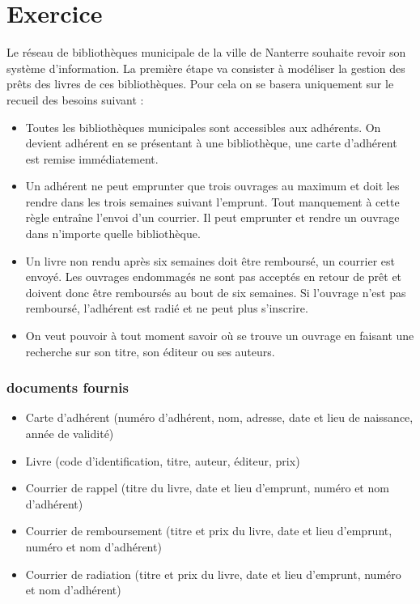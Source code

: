 \section*{Exercice}

Le réseau de bibliothèques municipale de la ville de Nanterre souhaite revoir son système d'information. La première étape va consister à modéliser la gestion des prêts des livres de ces bibliothèques. Pour cela on se basera uniquement sur le recueil des besoins suivant : \\
\begin{itemize}
	\item Toutes les bibliothèques municipales sont accessibles aux adhérents. On devient adhérent en se présentant à une bibliothèque, une carte d'adhérent est remise immédiatement.
	\item Un adhérent ne peut emprunter que trois ouvrages au maximum et doit les rendre dans les trois semaines suivant l'emprunt. Tout manquement à cette règle entraîne l’envoi d'un courrier. Il peut emprunter et rendre un ouvrage dans n'importe quelle bibliothèque.
	\item Un livre non rendu après six semaines doit être remboursé, un courrier est envoyé. Les ouvrages endommagés ne sont pas acceptés en retour de prêt et doivent donc être remboursés au bout de six semaines. Si l'ouvrage n'est pas remboursé, l'adhérent est radié et ne peut plus s'inscrire.
	\item On veut pouvoir à tout moment savoir où se trouve un ouvrage en faisant une recherche sur son titre, son éditeur ou ses auteurs.
\end{itemize}

\subsubsection*{documents fournis}
\begin{itemize}
	\item Carte d'adhérent (numéro d'adhérent, nom, adresse, date et lieu de naissance, année de validité)
	\item Livre (code d'identification, titre, auteur, éditeur, prix)
	\item Courrier de rappel (titre du livre, date et lieu d'emprunt, numéro et nom d'adhérent)
	\item Courrier de remboursement (titre et prix du livre, date et lieu d'emprunt, numéro et nom d'adhérent)
	\item Courrier de radiation (titre et prix du livre, date et lieu d'emprunt, numéro et nom d'adhérent)
\end{itemize}
